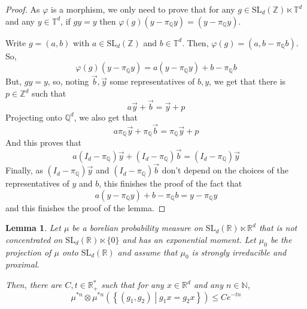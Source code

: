 \documentclass[11pt]{amsart}
\newtheorem{lemma}[theorem]{Lemma}
\theoremstyle{definition}
\theoremstyle{remark}
\numberwithin{equation}{section}
\begin{document}
\begin{proof}
As $\varphi$ is a morphism, we only need to prove that for any $g\in \mathrm{SL}_d({\mathbb Z}) \ltimes {\mathbb T}^d$ and any $y\in {\mathbb T}^d$, if $gy=y$ then $\varphi(g) (y-\pi_{\mathbb Q} y) = (y-\pi_{\mathbb Q} y)$.

Write $g=(a,b) $ with $a\in \mathrm{SL}_d({\mathbb Z})$ and $b\in {\mathbb T}^d$. Then, $\varphi(g) = (a,b-\pi_{\mathbb Q} b)$.
So,
\[
\varphi(g) (y-\pi_{\mathbb Q} y) = a (y-\pi_{\mathbb Q} y) + b-\pi_{\mathbb Q} b
\]
But, $gy=y$, so, noting $\overrightarrow{b}, \overrightarrow{y}$ some representatives of $b,y$, we get that there is $p\in {\mathbb Z}^d$ such that
\[
a \overrightarrow{y} + \overrightarrow{b} = \overrightarrow{y}+p
\]
Projecting onto ${\mathbb Q}^d$, we also get that
\[
a \pi_{\mathbb Q}\overrightarrow{y} + \pi_{\mathbb Q}\overrightarrow{b} = \pi_{\mathbb Q}\overrightarrow{y}+p
\]
And this proves that
\[
a (I_d-\pi_{\mathbb Q})\overrightarrow{y}+ (I_d-\pi_{\mathbb Q})\overrightarrow{b} = (I_d-\pi_{\mathbb Q})\overrightarrow{y}
\]
Finally, as $(I_d-\pi_{\mathbb Q})\overrightarrow{y}$ and $ (I_d-\pi_{\mathbb Q})\overrightarrow{b}$ don't depend on the choices of the representatives of $y$ and $b$, this finishes the proof of the fact that
\[
a(y-\pi_{\mathbb Q} y) + b-\pi_{\mathbb Q} b = y-\pi_{\mathbb Q} y
\]
and this finishes the proof of the lemma.
\end{proof}

\begin{lemma}\label{lemma:mesure_stab_Rd}
Let $\mu$ be a borelian probability measure on $\mathrm{SL}_d({\mathbb R}) \ltimes {\mathbb R}^d$ that is not concentrated on $\mathrm{SL}_d({\mathbb R}) \ltimes\{0\}$ and has an exponential moment. Let $\mu_0$ be the projection of $\mu$ onto $\mathrm{SL}_d({\mathbb R})$ and assume that $\mu_0$ is strongly irreducible and proximal.

Then, there are $C,t \in {\mathbb R}_+^\ast$ such that for any $x\in {\mathbb R}^d$ and any $n\in {\mathbb N}$,
\[
\mu^{\ast n} \otimes \mu^{\ast n}\left( \left\{(g_1,g_2) \middle| g_1x= g_2 x\right\} \right) \leqslant Ce^{-tn}
\]
\end{lemma}
\end{document}
